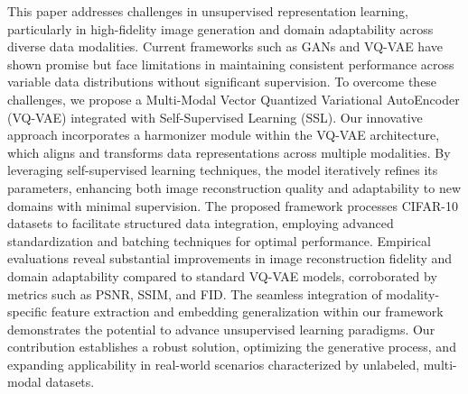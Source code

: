 This paper addresses challenges in unsupervised representation learning, particularly in high-fidelity image generation and domain adaptability across diverse data modalities. Current frameworks such as GANs and VQ-VAE have shown promise but face limitations in maintaining consistent performance across variable data distributions without significant supervision. To overcome these challenges, we propose a Multi-Modal Vector Quantized Variational AutoEncoder (VQ-VAE) integrated with Self-Supervised Learning (SSL). Our innovative approach incorporates a harmonizer module within the VQ-VAE architecture, which aligns and transforms data representations across multiple modalities. By leveraging self-supervised learning techniques, the model iteratively refines its parameters, enhancing both image reconstruction quality and adaptability to new domains with minimal supervision. The proposed framework processes CIFAR-10 datasets to facilitate structured data integration, employing advanced standardization and batching techniques for optimal performance. Empirical evaluations reveal substantial improvements in image reconstruction fidelity and domain adaptability compared to standard VQ-VAE models, corroborated by metrics such as PSNR, SSIM, and FID. The seamless integration of modality-specific feature extraction and embedding generalization within our framework demonstrates the potential to advance unsupervised learning paradigms. Our contribution establishes a robust solution, optimizing the generative process, and expanding applicability in real-world scenarios characterized by unlabeled, multi-modal datasets.
